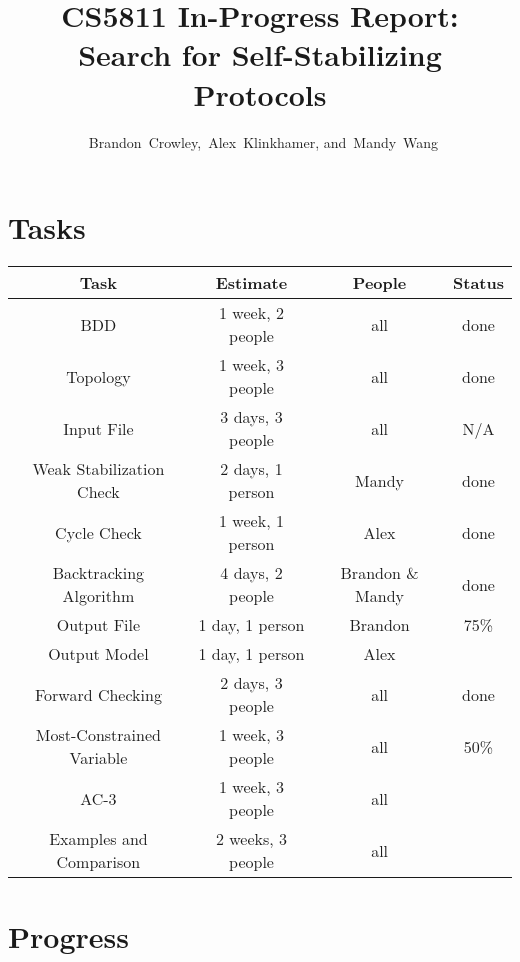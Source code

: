 


\usepackage{tikz}
\usetikzlibrary{arrows}
\usepackage{listings}



\title{
 CS5811 In-Progress Report:\\
 Search for Self-Stabilizing Protocols
}

\author{~Brandon~Crowley,~Alex~Klinkhamer, and~Mandy~Wang}
\maketitle




\section{Tasks}

\begin{center}
\begin{tabular}{|c||c|c|c|}
\hline
 Task & Estimate & People & Status \\
\hline
 BDD & 1 week, 2 people & all & done \\
 Topology & 1 week, 3 people & all & done \\
 Input File & 3 days, 3 people & all & N/A \\
 Weak Stabilization Check & 2 days, 1 person & Mandy & done \\
 Cycle Check & 1 week, 1 person & Alex & done \\
 Backtracking Algorithm & 4 days, 2 people & Brandon \& Mandy & done \\
 Output File & 1 day, 1 person &  Brandon & 75\% \\
 Output Model & 1 day, 1 person & Alex & \\
 Forward Checking & 2 days, 3 people & all & done \\
 Most-Constrained Variable & 1 week, 3 people & all & 50\% \\
 AC-3 & 1 week, 3 people & all & \\
 Examples and Comparison & 2 weeks, 3 people & all & \\
\hline
\end{tabular}
\end{center}

\section{Progress}

